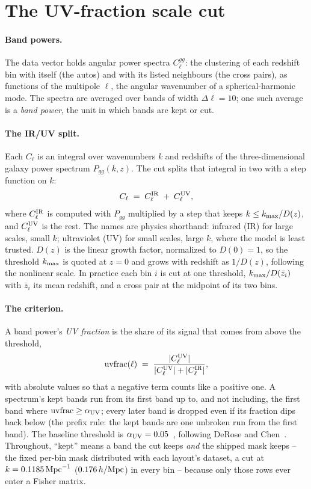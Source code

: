 \documentclass[11pt]{article}
\newcommand{\kmax}{k_{\rm max}}
\newcommand{\hMpc}{\,h/{\rm Mpc}}
\newcommand{\auv}{\alpha_{\rm UV}}
\begin{document}
\section{The UV-fraction scale cut}
\label{sec:cut}

\paragraph{Band powers.}
The data vector holds angular power spectra $C_\ell^{gg}$: the
clustering of each redshift bin with itself (the autos) and with its
listed neighbours (the cross pairs), as functions of the multipole
$\ell$, the angular wavenumber of a spherical-harmonic mode.  The
spectra are averaged over bands of width $\Delta\ell = 10$; one such
average is a \emph{band power}, the unit in which bands are kept or
cut.

\paragraph{The IR/UV split.}
Each $C_\ell$ is an integral over wavenumbers $k$ and redshifts of
the three-dimensional galaxy power spectrum $P_{gg}(k, z)$.  The cut splits
that integral in two with a step function on $k$:
\begin{equation}
  C_\ell \;=\; C_\ell^{\rm IR} \;+\; C_\ell^{\rm UV},
  \label{eq:split}
\end{equation}
where $C_\ell^{\rm IR}$ is computed with $P_{gg}$ multiplied by a
step that keeps $k \le \kmax/D(z)$, and $C_\ell^{\rm UV}$ is the
rest.  The names are physics shorthand: infrared (IR) for large
scales, small $k$; ultraviolet (UV) for small scales, large $k$,
where the model is least trusted.  $D(z)$ is the linear growth
factor, normalized to $D(0) = 1$, so the threshold $\kmax$ is quoted
at $z = 0$ and grows with redshift as $1/D(z)$, following the
nonlinear scale.  In practice each bin $i$ is cut at one threshold,
$\kmax/D(\bar{z}_i)$ with $\bar{z}_i$ its mean redshift, and a cross
pair at the midpoint of its two bins.

\paragraph{The criterion.}
A band power's \emph{UV fraction} is the share of its signal that
comes from above the threshold,
\begin{equation}
  {\rm uvfrac}(\ell) \;=\;
  \frac{|C_\ell^{\rm UV}|}{|C_\ell^{\rm UV}| + |C_\ell^{\rm IR}|},
  \label{eq:uvfrac}
\end{equation}
with absolute values so that a negative term counts like a positive
one.  A spectrum's kept bands run from its first band up to, and not
including, the first band where ${\rm uvfrac} \ge \auv$; every later
band is dropped even if its fraction dips back below (the prefix
rule: the kept bands are one unbroken run from the first band).  The
baseline threshold is $\auv = 0.05$~\cite{Saraivanov2026}, following
DeRose and Chen~\cite{DeRoseChen2025}.  Throughout, ``kept'' means a band the cut
keeps \emph{and} the shipped mask keeps -- the fixed per-bin mask
distributed with each layout's dataset, a cut at
$k = 0.1185\,{\rm Mpc}^{-1}$ ($0.176\hMpc$) in every bin -- because only those rows
ever enter a Fisher matrix.
\end{document}
